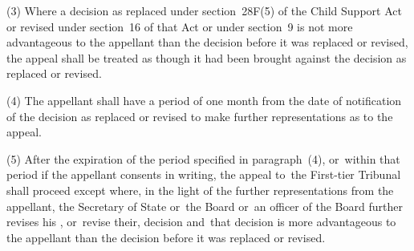 \documentclass[12pt,a4paper]{article}
\begin{document}
(3) Where a decision as 
replaced under section~28F(5) of the Child Support Act or revised under section~16 of that Act  %
or under section~9 is not more advantageous to the appellant than the decision before it was 
replaced or  %
revised, the appeal shall be treated as though it had been brought against the decision as 
replaced or  %
revised.

(4) The appellant shall have a period of one month from the date of notification of the decision as 
replaced or  %
revised to make further representations as to the appeal.

(5) After the expiration of the period specified in paragraph~(4), or~within that period if the appellant consents in writing, the appeal to~the 
First-tier Tribunal  %
shall proceed except where, in the light of the further representations from the appellant, the Secretary of State
or~the Board or~an officer of the Board  %
further revises his%
, or~revise their,  %
decision and~that decision is more advantageous to the appellant than the decision before it was 
replaced or  %
revised.

\end{document}
